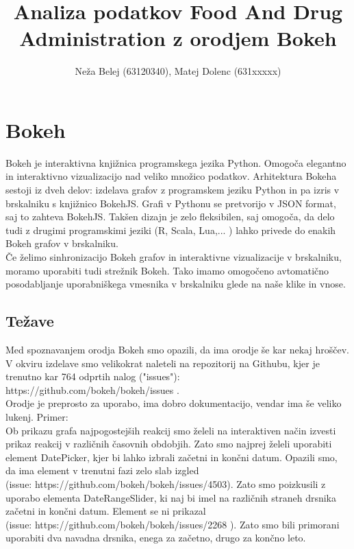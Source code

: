 \documentclass[a4paper,10pt]{article}
\title{Analiza podatkov Food And Drug Administration z orodjem Bokeh}
\author{Neža Belej (63120340), Matej Dolenc (631xxxxx)}
\begin{document}
\maketitle
\section {Bokeh}
Bokeh je interaktivna knjižnica programskega jezika Python. Omogoča elegantno in interaktivno vizualizacijo nad veliko množico podatkov.
Arhitektura Bokeha sestoji iz dveh delov: izdelava grafov z programskem jeziku Python in pa izris v brskalniku s knjižnico BokehJS. Grafi v Pythonu se pretvorijo v JSON format, saj to zahteva BokehJS. Takšen dizajn je zelo fleksibilen, saj omogoča, da delo tudi z drugimi programskimi jeziki (R, Scala, Lua,... ) lahko privede do enakih Bokeh grafov v brskalniku. \\
Če želimo sinhronizacijo Bokeh grafov in interaktivne vizualizacije v brskalniku, moramo uporabiti tudi strežnik Bokeh. Tako imamo omogočeno avtomatično posodabljanje uporabniškega vmesnika v brskalniku glede na naše klike in vnose.

\subsection{Težave}
Med spoznavanjem orodja Bokeh smo opazili, da ima orodje še kar nekaj hroščev. V okviru izdelave smo velikokrat naleteli na repozitorij na Githubu, kjer je trenutno kar 764 odprtih nalog ("issues"): \\ https://github.com/bokeh/bokeh/issues . \\Orodje je preprosto za uporabo, ima dobro dokumentacijo, vendar ima še veliko lukenj. Primer: \\
Ob prikazu grafa najpogostejših reakcij smo želeli na interaktiven način izvesti prikaz reakcij v različnih časovnih obdobjih.
Zato smo najprej želeli uporabiti element DatePicker, kjer bi lahko izbrali začetni in končni datum. Opazili smo, da ima element v trenutni fazi zelo slab izgled \\  (issue: https://github.com/bokeh/bokeh/issues/4503). Zato smo poizkusili z uporabo elementa DateRangeSlider, ki naj bi imel na različnih straneh drsnika začetni in končni datum. Element se ni prikazal \\ (issue: https://github.com/bokeh/bokeh/issues/2268 ). Zato smo bili primorani uporabiti dva navadna drsnika, enega za začetno, drugo za končno leto. 
\end{document}
